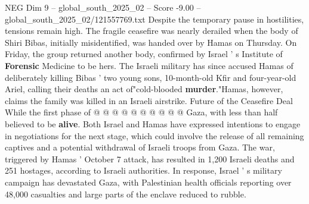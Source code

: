 \begin{textsample}{NEG Dim 9 – global\_south\_2025\_02 – Score -9.00 – global\_south\_2025\_02/121557769.txt}
Despite the temporary pause in hostilities, tensions remain high.
The fragile ceasefire was nearly derailed when the body of Shiri Bibas, initially misidentified, was handed over by Hamas on Thursday.
On Friday, the group returned another body, confirmed by Israel ' s Institute of \textbf{Forensic} Medicine to be hers.
The Israeli military has since accused Hamas of deliberately killing Bibas ' two young sons, 10-month-old Kfir and four-year-old Ariel, calling their deaths an act of"cold-blooded \textbf{murder}."Hamas, however, claims the family was killed in an Israeli airstrike.
Future of the Ceasefire Deal While the first phase of @ @ @ @ @ @ @ @ @ @ Gaza, with less than half believed to be \textbf{alive}.
Both Israel and Hamas have expressed intentions to engage in negotiations for the next stage, which could involve the release of all remaining captives and a potential withdrawal of Israeli troops from Gaza.
The war, triggered by Hamas ' October 7 attack, has resulted in 1,200 Israeli deaths and 251 hostages, according to Israeli authorities.
In response, Israel ' s military campaign has devastated Gaza, with Palestinian health officials reporting over 48,000 casualties and large parts of the enclave reduced to rubble.

\end{textsample}
